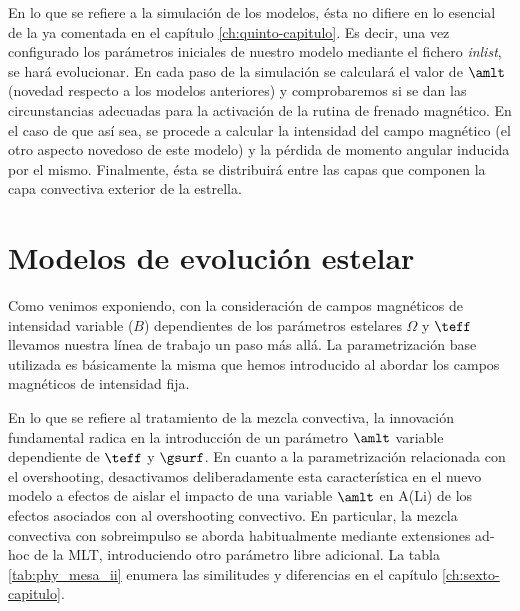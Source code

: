 En lo que se refiere a la simulación de los modelos, ésta no difiere en lo esencial de la ya comentada en el capítulo \ref{ch:quinto-capitulo}. Es decir, una vez configurado los parámetros iniciales de nuestro modelo mediante el fichero \textit{inlist}, se hará evolucionar. En cada paso de la simulación se calculará el valor de $\amlt$ (novedad respecto a los modelos anteriores) y comprobaremos si se dan las circunstancias adecuadas para la activación de la rutina de frenado magnético. En el caso de que así sea, se procede a calcular la intensidad del campo magnético (el otro aspecto novedoso de este modelo) y la pérdida de momento angular inducida por el mismo. Finalmente, ésta se distribuirá entre las capas que componen la capa convectiva exterior de la estrella.\par

\section{Modelos de evolución estelar}
Como venimos exponiendo, con la consideración de campos magnéticos de intensidad variable ($B$) dependientes de los parámetros estelares $\Omega$ y $\teff$ llevamos nuestra línea de trabajo un paso más allá. La parametrización base utilizada es básicamente la misma que hemos introducido al abordar los campos magnéticos de intensidad fija.\par 

En lo que se refiere al tratamiento de la mezcla convectiva, la innovación fundamental radica en la introducción de un parámetro $\amlt$ variable dependiente de $\teff$ y $\gsurf$. En cuanto a la parametrización relacionada con el overshooting, desactivamos deliberadamente esta característica en el nuevo modelo a efectos de aislar el impacto de una variable $\amlt$ en A(Li) de los efectos asociados con al overshooting convectivo. En particular, la mezcla convectiva con sobreimpulso se aborda habitualmente mediante extensiones ad-hoc de la MLT, introduciendo otro parámetro libre adicional. La tabla \ref{tab:phy_mesa_ii} enumera las similitudes y diferencias en el capítulo \ref{ch:sexto-capitulo}.\par

